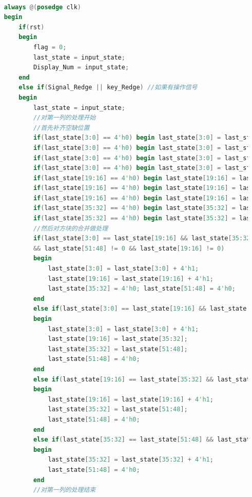 \documentclass[UTF8]{article}
\begin{document}
\begin{lstlisting}[language=Verilog]
	
	always @(posedge clk)
	begin
		if(rst)
		begin
			flag = 0;
			last_state = input_state;
			Display_Num = input_state;
		end
		else if(Signal_Redge || key_Redge) //如果有操作信号
		begin
			last_state = input_state;
			//对第一列的处理开始
			//首先补齐空缺位置
			if(last_state[3:0] == 4'h0) begin last_state[3:0] = last_state[19:16]; last_state[19:16] = last_state[35:32]; last_state[35:32] = last_state[51:48]; last_state[51:48] = 0; end
			if(last_state[3:0] == 4'h0) begin last_state[3:0] = last_state[19:16]; last_state[19:16] = last_state[35:32]; last_state[35:32] = last_state[51:48]; last_state[51:48] = 0; end
			if(last_state[3:0] == 4'h0) begin last_state[3:0] = last_state[19:16]; last_state[19:16] = last_state[35:32]; last_state[35:32] = last_state[51:48]; last_state[51:48] = 0; end
			if(last_state[3:0] == 4'h0) begin last_state[3:0] = last_state[19:16]; last_state[19:16] = last_state[35:32]; last_state[35:32] = last_state[51:48]; last_state[51:48] = 0; end
			if(last_state[19:16] == 4'h0) begin last_state[19:16] = last_state[35:32]; last_state[35:32] = last_state[51:48]; last_state[51:48] = 0; end
			if(last_state[19:16] == 4'h0) begin last_state[19:16] = last_state[35:32]; last_state[35:32] = last_state[51:48]; last_state[51:48] = 0; end
			if(last_state[19:16] == 4'h0) begin last_state[19:16] = last_state[35:32]; last_state[35:32] = last_state[51:48]; last_state[51:48] = 0; end
			if(last_state[35:32] == 4'h0) begin last_state[35:32] = last_state[51:48]; last_state[51:48] = 0; end
			if(last_state[35:32] == 4'h0) begin last_state[35:32] = last_state[51:48]; last_state[51:48] = 0; end
			//然后对方块的合并做处理
			if(last_state[3:0] == last_state[19:16] && last_state[35:32] == last_state[51:48]
			&& last_state[51:48] != 0 && last_state[19:16] != 0)
			begin
				last_state[3:0] = last_state[3:0] + 4'h1;
				last_state[19:16] = last_state[19:16] + 4'h1;
				last_state[35:32] = 4'h0; last_state[51:48] = 4'h0;
			end
			else if(last_state[3:0] == last_state[19:16] && last_state[19:16] != 0)
			begin
				last_state[3:0] = last_state[3:0] + 4'h1;
				last_state[19:16] = last_state[35:32];
				last_state[35:32] = last_state[51:48]; 
				last_state[51:48] = 4'h0;
			end
			else if(last_state[19:16] == last_state[35:32] && last_state[19:16] != 0)
			begin
				last_state[19:16] = last_state[19:16] + 4'h1;
				last_state[35:32] = last_state[51:48];
				last_state[51:48] = 4'h0;
			end
			else if(last_state[35:32] == last_state[51:48] && last_state[51:48] != 0)
			begin
				last_state[35:32] = last_state[35:32] + 4'h1; 
				last_state[51:48] = 4'h0;
			end
			//对第一列的处理结束
			

\end{lstlisting}
\end{document}

